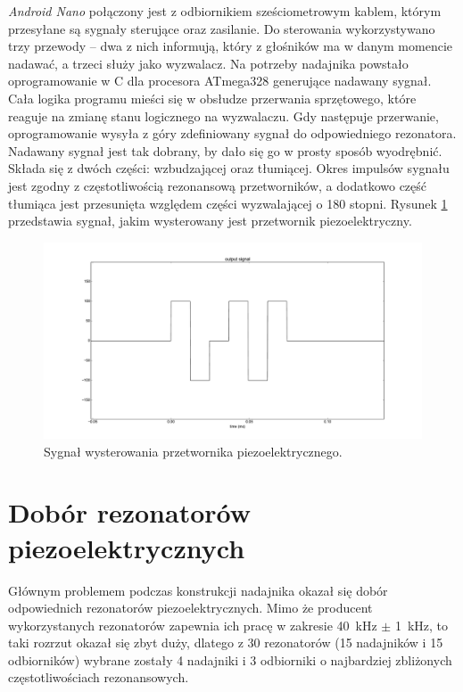 

\textit{Android Nano} połączony jest z odbiornikiem sześciometrowym kablem, którym przesyłane są sygnały sterujące oraz zasilanie.
Do sterowania wykorzystywano trzy przewody -- dwa z nich informują, który z głośników ma w danym momencie nadawać,
a trzeci służy jako wyzwalacz. 
Na potrzeby nadajnika powstało oprogramowanie w C dla procesora ATmega328 generujące nadawany sygnał.
Cała logika programu mieści się w obsłudze przerwania sprzętowego, które reaguje na zmianę stanu logicznego
na wyzwalaczu.
Gdy następuje przerwanie, oprogramowanie wysyła z góry zdefiniowany sygnał do odpowiedniego rezonatora. 
Nadawany sygnał jest tak dobrany, by dało się go w prosty sposób wyodrębnić. Składa się z dwóch
części: wzbudzającej oraz tłumiącej.
Okres impulsów sygnału jest zgodny z częstotliwością rezonansową przetworników, a dodatkowo część tłumiąca
jest przesunięta względem części wyzwalającej o 180 stopni.  
Rysunek \ref{fig:output_signal} przedstawia sygnał, jakim wysterowany jest przetwornik piezoelektryczny. 


\begin{figure}[h!]
    \centering
    \includegraphics[width=1.15\textwidth, trim= 47mm 0mm 0mm 0mm,clip]{output_signal}
    \caption{Sygnał wysterowania przetwornika piezoelektrycznego.}
    \label{fig:output_signal}
\end{figure}

\newpage

\section{Dobór rezonatorów piezoelektrycznych}

Głównym problemem podczas konstrukcji nadajnika okazał się dobór odpowiednich rezonatorów piezoelektrycznych.
Mimo że producent wykorzystanych rezonatorów zapewnia ich pracę w zakresie \SI{40}{kHz} $\pm$ \SI{1}{kHz},
to taki rozrzut okazał się zbyt duży, 
dlatego z 30 rezonatorów (15 nadajników i 15 odbiorników) wybrane zostały 4 nadajniki i 3 odbiorniki o najbardziej 
zbliżonych częstotliwościach rezonansowych.

